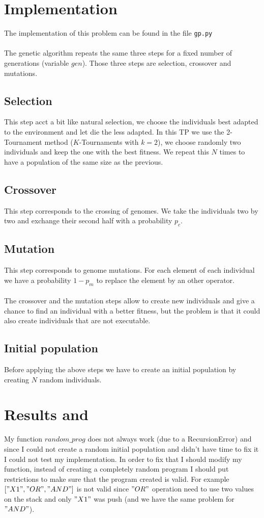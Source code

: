 \documentclass[14pt]
{article}
\begin{document}
\section{Implementation}
The implementation of this problem can be found in the file \texttt{gp.py}\\
\\
The genetic algorithm repeats the same three steps for a fixed number of generations (variable $gen$). Those three steps are selection, crossover and mutations.

\subsection{Selection} 
This step acct a bit like natural selection, we choose the individuals best adapted to the environment and let die the less adapted. In this TP we use the 2-Tournament method ($K$-Tournaments with $k=2$), we choose randomly two individuals and keep the one with the best fitness. We repeat this $N$ times to have a population of the same size as the previous.

\subsection{Crossover}
This step corresponds to the crossing of genomes. We take the individuals two by two and exchange their second half with a probability $p_c$.

\subsection{Mutation}
This step corresponds to genome mutations. For each element of each individual we have a probability $1-p_{m}$ to replace the element by an other operator.\\
\\
The crossover and the mutation steps allow to create new individuals and give a chance to find an individual with a better fitness, but the problem is that it could also create individuals that are not executable.

\subsection{Initial population} 
Before applying the above steps we have to create an initial population by creating $N$ random individuals.

\section{Results and }
My function $random\_prog$ does not always work (due to a RecursionError) and since I could not create a random initial population and didn't have time to fix it I could not test my implementation. In order to fix that I should modify my function, instead of creating a completely random program I should put restrictions to make sure that the program created is valid. For example $["X1", "OR", "AND"]$ is not valid since $"OR"$ operation need to use two values on the stack and only $"X1"$ was push (and we have the same problem for $"AND"$).
\end{document}
